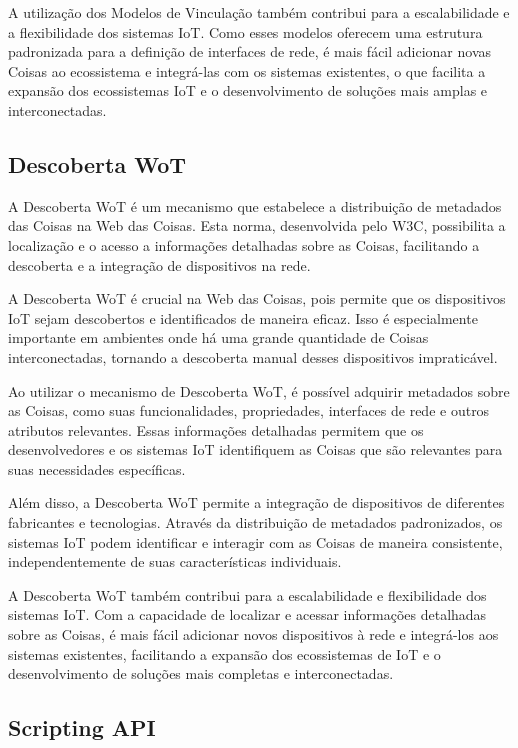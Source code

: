 A utilização dos Modelos de Vinculação também contribui para a escalabilidade e a flexibilidade dos sistemas IoT. Como esses modelos oferecem uma estrutura padronizada para a definição de interfaces de rede, é mais fácil adicionar novas Coisas ao ecossistema e integrá-las com os sistemas existentes, o que facilita a expansão dos ecossistemas IoT e o desenvolvimento de soluções mais amplas e interconectadas.

\subsection{Descoberta WoT}

A Descoberta WoT é um mecanismo que estabelece a distribuição de metadados das Coisas na Web das Coisas. Esta norma, desenvolvida pelo W3C, possibilita a localização e o acesso a informações detalhadas sobre as Coisas, facilitando a descoberta e a integração de dispositivos na rede.

A Descoberta WoT é crucial na Web das Coisas, pois permite que os dispositivos IoT sejam descobertos e identificados de maneira eficaz. Isso é especialmente importante em ambientes onde há uma grande quantidade de Coisas interconectadas, tornando a descoberta manual desses dispositivos impraticável.

Ao utilizar o mecanismo de Descoberta WoT, é possível adquirir metadados sobre as Coisas, como suas funcionalidades, propriedades, interfaces de rede e outros atributos relevantes. Essas informações detalhadas permitem que os desenvolvedores e os sistemas IoT identifiquem as Coisas que são relevantes para suas necessidades específicas.

Além disso, a Descoberta WoT permite a integração de dispositivos de diferentes fabricantes e tecnologias. Através da distribuição de metadados padronizados, os sistemas IoT podem identificar e interagir com as Coisas de maneira consistente, independentemente de suas características individuais.

A Descoberta WoT também contribui para a escalabilidade e flexibilidade dos sistemas IoT. Com a capacidade de localizar e acessar informações detalhadas sobre as Coisas, é mais fácil adicionar novos dispositivos à rede e integrá-los aos sistemas existentes, facilitando a expansão dos ecossistemas de IoT e o desenvolvimento de soluções mais completas e interconectadas.

\subsection{Scripting API}

